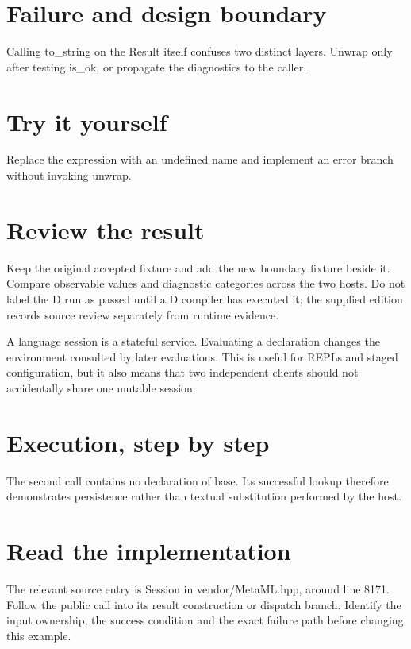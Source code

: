 
\section*{Failure and design boundary}
Calling to\_string on the Result itself confuses two distinct layers. Unwrap only after testing is\_ok, or propagate the diagnostics to the caller.

\section*{Try it yourself}
Replace the expression with an undefined name and implement an error branch without invoking unwrap.

\section*{Review the result}
Keep the original accepted fixture and add the new boundary fixture beside it. Compare observable values and diagnostic categories across the two hosts. Do not label the D run as passed until a D compiler has executed it; the supplied edition records source review separately from runtime evidence.

\clearpage
{}
A language session is a stateful service. Evaluating a declaration changes the environment consulted by later evaluations. This is useful for REPLs and staged configuration, but it also means that two independent clients should not accidentally share one mutable session.


\section*{Execution, step by step}
The second call contains no declaration of base. Its successful lookup therefore demonstrates persistence rather than textual substitution performed by the host.

\section*{Read the implementation}
The relevant source entry is Session in vendor/MetaML.hpp, around line 8171. Follow the public call into its result construction or dispatch branch. Identify the input ownership, the success condition and the exact failure path before changing this example.

